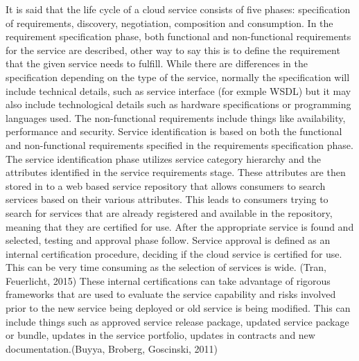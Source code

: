 \documentclass{article}
\begin{document}
It is said that the life cycle of a cloud service consists of five phases: specification of requirements, discovery, negotiation, composition and consumption. In the requirement specification phase, both functional and non-functional requirements for the service are described, other way to say this is to define the requirement that the given service needs to fulfill. While there are differences in the specification depending on the type of the service, normally the specification will include technical details, such as service interface (for exmple WSDL) but it may also include technological details such as hardware specifications or programming languages used. The non-functional requirements include things like availability, performance and security. Service identification is based on both the functional and non-functional requirements specified in the requirements specification phase. The service identification phase utilizes service category hierarchy and the attributes identified in the service requirements stage. These attributes are then stored in to a web based service repository that allows consumers to search services based on their various attributes. This leads to consumers trying to search for services that are already registered and available in the repository, meaning that they are certified for use. After the appropriate service is found and selected, testing and approval phase follow. Service approval is defined as an internal certification procedure, deciding if the cloud service is certified for use. This can be very time consuming as the selection of services is wide. (Tran, Feuerlicht, 2015) These internal certifications can take advantage of rigorous frameworks that are used to evaluate the service capability and risks involved prior to the new service being deployed or old service is being modified. This can include things such as approved service release package, updated service package or bundle, updates in the service portfolio, updates in contracts and new documentation.(Buyya, Broberg, Goscinski, 2011) 
\par
\end{document}
